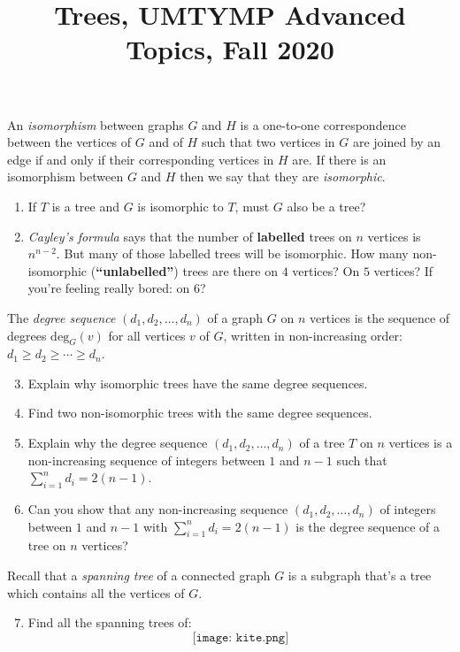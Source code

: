 \documentclass[11pt]{article}
\title{Trees, UMTYMP Advanced Topics, Fall 2020}
\date{}
\begin{document}
\maketitle

\vspace{-1cm}

\thispagestyle{empty}

An \emph{isomorphism} between graphs $G$ and $H$ is a one-to-one correspondence between the vertices of $G$ and of $H$ such that two vertices in $G$ are joined by an edge if and only if their corresponding vertices in $H$ are. If there is an isomorphism between $G$ and $H$ then we say that they are \emph{isomorphic}.

\begin{enumerate}

\item If $T$ is a tree and $G$ is isomorphic to $T$, must $G$ also be a tree?

\item\emph{Cayley's formula} says that the number of {\bf labelled} trees on $n$ vertices is $n^{n-2}$. But many of those labelled trees will be isomorphic. How many non-isomorphic ({\bf ``unlabelled''}) trees are there on $4$ vertices? On $5$ vertices? If you're feeling really bored: on $6$?

\end{enumerate}

The \emph{degree sequence} $(d_1, d_2, \ldots, d_n)$ of a graph $G$ on $n$ vertices is the sequence of degrees $\mathrm{deg}_G(v)$ for all vertices $v$ of $G$, written in non-increasing order: $d_1\geq d_2 \geq \cdots \geq d_n$.

\begin{enumerate}

\setcounter{enumi}{2}

\item Explain why isomorphic trees have the same degree sequences.

\item Find two non-isomorphic trees with the same degree sequences.

\item Explain why the degree sequence $(d_1, d_2, \ldots, d_n)$ of a tree $T$ on $n$ vertices is a non-increasing sequence of integers between $1$ and $n-1$ such that $\sum_{i=1}^{n} d_i = 2(n-1)$.

\item Can you show that any non-increasing sequence $(d_1, d_2, \ldots, d_n)$ of integers between $1$ and $n-1$ with $\sum_{i=1}^{n} d_i = 2(n-1)$ is the degree sequence of a tree on $n$ vertices?

\end{enumerate}

Recall that a \emph{spanning tree} of a connected graph $G$ is a subgraph that's a tree which contains all the vertices of $G$.

\begin{enumerate}
\setcounter{enumi}{6}
\item Find all the spanning trees of:
\[\texttt{[image: kite.png]}\]
\end{enumerate}
\end{document}
